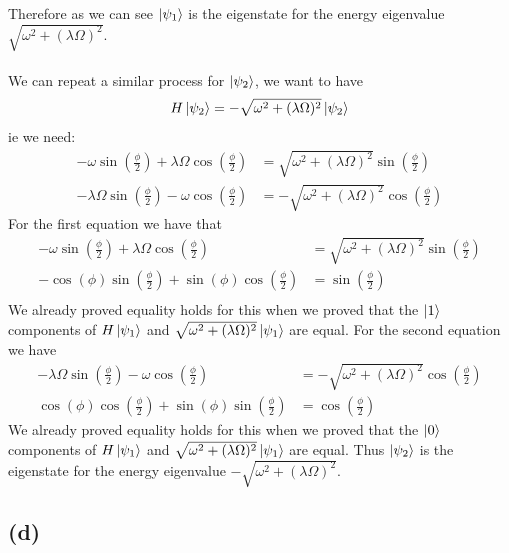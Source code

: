 \documentclass[11pt]{article}
\begin{document}
Therefore as we can see $\ket{\psi_1}$ is the eigenstate 
for the energy eigenvalue $\sqrt{\omega^2+(\lambda\Omega)^2}$.\\\\
We can repeat a similar process for $\ket{\psi_2}$, we want to have 
$$
H\ket{\psi_2} = -\sqrt{\omega^2+(\lambda\Omega)^2}\ket{\psi_2}
$$
ie we need:
\begin{align*}
    -\omega\sin\left(\frac{\phi}{2}\right)+\lambda\Omega\cos\left(
        \frac{\phi}{2}\right) &= \sqrt{\omega^2+(\lambda\Omega)^2}\sin\left(\frac{\phi}{2}\right)\\
    -\lambda\Omega\sin\left(\frac{\phi}{2}\right)-\omega\cos\left(\frac{\phi}{2}\right)
    &= -\sqrt{\omega^2+(\lambda\Omega)^2}\cos\left(\frac{\phi}{2}\right)
\end{align*}
For the first equation we have that 
\begin{align*}
    -\omega\sin\left(\frac{\phi}{2}\right)+\lambda\Omega\cos\left(
        \frac{\phi}{2}\right) &= \sqrt{\omega^2+(\lambda\Omega)^2}\sin\left(\frac{\phi}{2}\right)\\
    -\cos(\phi)\sin\left(\frac{\phi}{2}\right)+\sin(\phi)\cos\left(\frac{\phi}{2}\right) &= \sin\left(\frac{\phi}{2}\right)\\
\end{align*}
We already proved equality holds for this when we proved that the $\ket{1}$ components 
of $H\ket{\psi_1}$ and $\sqrt{\omega^2+(\lambda\Omega)^2}\ket{\psi_1}$ are equal. For the second equation we have 
\begin{align*}
    -\lambda\Omega\sin\left(\frac{\phi}{2}\right)-\omega\cos\left(\frac{\phi}{2}\right)
    &= -\sqrt{\omega^2+(\lambda\Omega)^2}\cos\left(\frac{\phi}{2}\right)\\
    \cos(\phi)\cos\left(\frac{\phi}{2}\right)+
\sin(\phi)\sin\left(\frac{\phi}{2}\right) &= \cos\left(\frac{\phi}{2}\right)
\end{align*}
We already proved equality holds for this when we proved that the $\ket{0}$ components 
of $H\ket{\psi_1}$ and $\sqrt{\omega^2+(\lambda\Omega)^2}\ket{\psi_1}$ are equal. Thus $\ket{\psi_2}$ is the eigenstate 
for the energy eigenvalue $-\sqrt{\omega^2+(\lambda\Omega)^2}$.
\subsection*{(d)}
\end{document}
